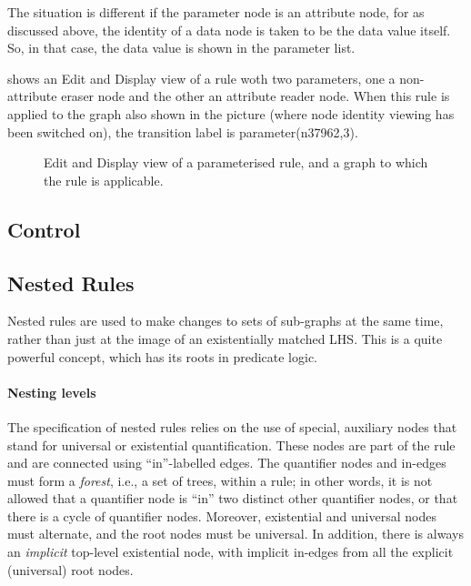 The situation is different if the parameter node is an attribute node, for as
discussed above, the identity of a data node is taken to be the data value
itself. So, in that case, the data value is shown in the parameter list.

 shows an Edit and Display view of a rule woth two parameters,
one a non-attribute eraser node and the other an attribute reader node. When
this rule is applied to the graph also shown in the picture (where node
identity viewing has been switched on), the transition label is
\textsf{parameter(n37962,3)}.

\begin{figure}
\begin{center}
 \qquad
{} \qquad
{}
\end{center}
\vspace*{-\medskipamount}
\caption{Edit and Display view of a parameterised rule, and a graph to which
the rule is applicable.}
\end{figure}

\subsection{Control}


\subsection{Nested Rules}

Nested rules are used to make changes to sets of sub-graphs at the same time,
rather than just at the image of an existentially matched LHS. This is a quite
powerful concept, which has its roots in predicate logic.

\paragraph{Nesting levels}

The specification of nested rules relies on the use of special, auxiliary nodes
that stand for universal or existential quantification. These nodes are part of
the rule and are connected using ``\textsf{in}''-labelled edges. The quantifier
nodes and \textsf{in}-edges must form a \emph{forest}, i.e., a set of trees,
within a rule; in other words, it is not allowed that a quantifier node is
``\textsf{in}'' two distinct other quantifier nodes, or that there is a cycle
of quantifier nodes. Moreover, existential and universal nodes must alternate,
and the root nodes must be universal. In addition, there is always an
\emph{implicit} top-level existential node, with implicit \textsf{in}-edges
from all the explicit (universal) root nodes.

